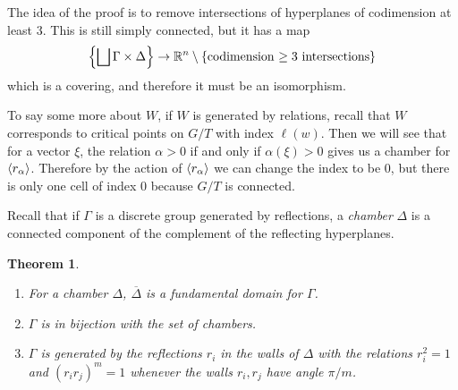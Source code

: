 \documentclass[leqno, openany]{memoir}
\newtheorem{thm}{Theorem}[section]
\theoremstyle{definition}
\theoremstyle{remark}
\theoremstyle{plain}
\theoremstyle{definition}
\theoremstyle{remark}
\newcommand{\R}{\mathbb{R}}
\newcommand{\ol}[1]{\overline{#1}}
\begin{document}
The idea of the proof is to remove intersections of hyperplanes of codimension at least $3$. This is still simply connected, but it has a map
\[ \qty{\bigsqcup \Gamma \times \Delta} \to \R^n \setminus \qty{\text{codimension $\geq 3$ intersections}} \]
which is a covering, and therefore it must be an isomorphism.

To say some more about $W$, if $W$ is generated by relations, recall that $W$ corresponds to critical points on $G/T$ with index $\ell(w)$. Then we will see that for a vector $\xi$, the relation $\alpha > 0$ if and only if $\alpha(\xi) > 0$ gives us a chamber for $\ev{r_{\alpha}}$. Therefore by the action of $\ev{r_{\alpha}}$ we can change the index to be $0$, but there is only one cell of index $0$ because $G/T$ is connected.

Recall that if $\Gamma$ is a discrete group generated by reflections, a \textit{chamber} $\Delta$ is a connected component of the complement of the reflecting hyperplanes.

\begin{thm}
    \begin{enumerate}
        \item For a chamber $\Delta$, $\ol{\Delta}$ is a fundamental domain for $\Gamma$.
        \item $\Gamma$ is in bijection with the set of chambers.
        \item $\Gamma$ is generated by the reflections $r_i$ in the walls of $\Delta$ with the relations $r_i^2 = 1$ and ${(r_i r_j)}^m = 1$ whenever the walls $r_i, r_j$ have angle $\pi / m$.
    \end{enumerate}
\end{thm}
\end{document}
